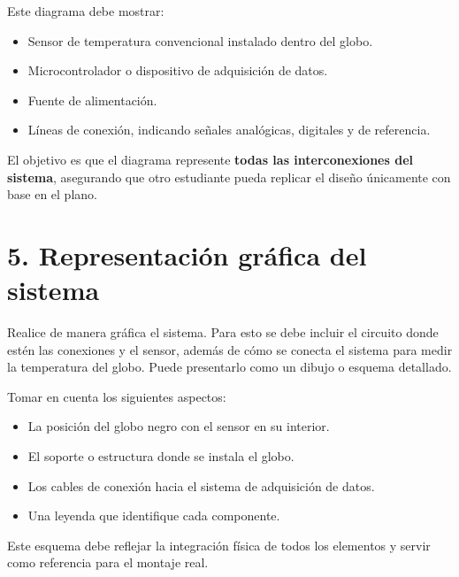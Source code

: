 \documentclass[12pt]{article}
\begin{document}
Este diagrama debe mostrar:

\begin{itemize}
    \item Sensor de temperatura convencional instalado dentro del globo.
    \item Microcontrolador o dispositivo de adquisición de datos.
    \item Fuente de alimentación.
    \item Líneas de conexión, indicando señales analógicas, digitales y de referencia.
\end{itemize}

El objetivo es que el diagrama represente \textbf{todas las interconexiones del sistema}, asegurando que otro estudiante pueda replicar el diseño únicamente con base en el plano.

\section*{5. Representación gráfica del sistema}
Realice de manera gráfica el sistema. Para esto se debe incluir el circuito donde estén las conexiones y el sensor, además de cómo se conecta el sistema para medir la temperatura del globo. Puede presentarlo como un dibujo o esquema detallado. 

Tomar en cuenta los siguientes aspectos:
\begin{itemize}
    \item La posición del globo negro con el sensor en su interior.
    \item El soporte o estructura donde se instala el globo.
    \item Los cables de conexión hacia el sistema de adquisición de datos.
    \item Una leyenda que identifique cada componente.
\end{itemize}

Este esquema debe reflejar la integración física de todos los elementos y servir como referencia para el montaje real.
\end{document}
